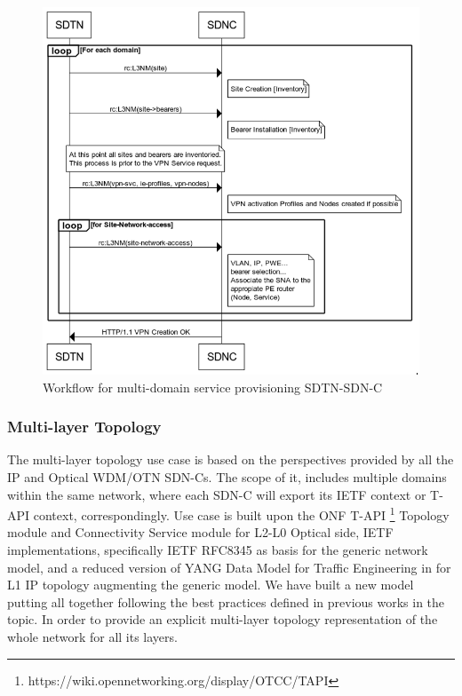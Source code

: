 \documentclass[a4paper,fleqn]{cas-dc}
\begin{document}
\begin{figure}
	\centering
		\includegraphics[width=\linewidth]{figs/multidomain_service_provisioning_workflow.png}
	\caption{Workflow for multi-domain service provisioning SDTN-SDN-C}
	\label{FIG:multidomain_service_provisioning_workflow}
\end{figure}

\subsubsection{Multi-layer Topology}
The multi-layer topology use case is based on the perspectives provided by all the IP and Optical WDM/OTN SDN-Cs. The scope of it, includes multiple domains within the same network, where each SDN-C will export its IETF context or T-API context, correspondingly. Use case is built upon the ONF T-API \footnote{https://wiki.opennetworking.org/display/OTCC/TAPI} Topology module and Connectivity Service module for L2-L0 Optical side, IETF implementations, specifically IETF RFC8345 \cite{rfc8345} as basis for the generic network model, and a reduced version of YANG Data Model for Traffic Engineering in \cite{ietf-teas-yang-te-topo-22} for L1 IP topology augmenting the generic model. We have built a new model putting all together following the best practices defined in previous works in the topic. In order to provide an explicit multi-layer topology representation of the whole network for all its layers. 
\end{document}
